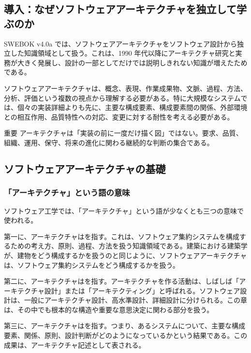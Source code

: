\documentclass[a4paper,11pt]{ltjsarticle}
\numberwithin{figure}{section}
\numberwithin{table}{section}
\begin{document}
\subsection*{導入：なぜソフトウェアアーキテクチャを独立して学ぶのか}
SWEBOK v4.0a では、ソフトウェアアーキテクチャをソフトウェア設計から独立した知識領域として扱う。これは、1990 年代以降にアーキテクチャ研究と実務が大きく発展し、設計の一部としてだけでは説明しきれない知識が増えたためである。

ソフトウェアアーキテクチャは、概念、表現、作業成果物、文脈、過程、方法、分析、評価という複数の視点から理解する必要がある。特に大規模なシステムでは、個々の実装詳細よりも先に、主要な構成要素、構成要素間の関係、外部環境との相互作用、品質特性への対応、変更に対する耐性を考える必要がある。

\begin{statementbox}{重要}
アーキテクチャは「実装の前に一度だけ描く図」ではない。要求、品質、組織、運用、保守、将来の進化に関わる継続的な判断の集合である。
\end{statementbox}

\subsection{ソフトウェアアーキテクチャの基礎}

\subsubsection{「アーキテクチャ」という語の意味}
ソフトウェア工学では、「アーキテクチャ」という語が少なくとも三つの意味で使われる。

第一に、アーキテクチャはを指す。これは、ソフトウェア集約システムを構成するための考え方、原則、過程、方法を扱う知識領域である。建築における建築学が、建物をどう構成するかを扱うのと同じように、ソフトウェアアーキテクチャは、ソフトウェア集約システムをどう構成するかを扱う。

第二に、アーキテクチャはを指す。アーキテクチャを作る活動は、しばしば「アーキテクチャ設計」または「アーキテクティング」と呼ばれる。ソフトウェア設計は、一般にアーキテクチャ設計、高水準設計、詳細設計に分けられる。この章は、その中でも根本的な構造や重要な意思決定に関わる部分を扱う。

第三に、アーキテクチャはを指す。つまり、あるシステムについて、主要な構成要素、関係、原則、設計判断がどのようになっているかという結果である。この成果は、アーキテクチャ記述として表される。
\end{document}
